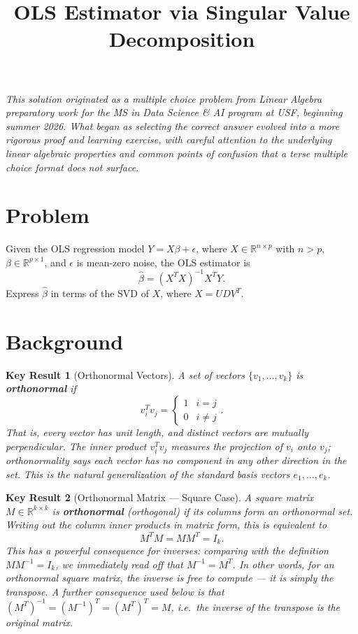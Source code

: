 \documentclass{article}
\title{OLS Estimator via Singular Value Decomposition}
\date{}
\newtheorem*{result}{Key Result}
\begin{document}
\maketitle

\noindent\textit{This solution originated as a multiple choice problem from Linear Algebra
preparatory work for the MS in Data Science \& AI program at USF, beginning summer 2026. What began as selecting the correct answer evolved
into a more rigorous proof and learning exercise, with careful attention to the
underlying linear algebraic properties and common points of confusion that
a terse multiple choice format does not surface.}


\section*{Problem}

Given the OLS regression model $Y = X\beta + \epsilon$, where $X \in \mathbb{R}^{n \times p}$
with $n > p$, $\beta \in \mathbb{R}^{p \times 1}$, and $\epsilon$ is mean-zero noise,
the OLS estimator is
\[
    \hat{\beta} = (X^T X)^{-1} X^T Y.
\]
Express $\hat{\beta}$ in terms of the SVD of $X$, where $X = UDV^T$.

\section*{Background}

\begin{result}[Orthonormal Vectors]
A set of vectors $\{v_1, \ldots, v_k\}$ is \textbf{orthonormal} if
\[
    v_i^T v_j = \begin{cases} 1 & i = j \\ 0 & i \neq j \end{cases}.
\]
That is, every vector has unit length, and distinct vectors are mutually perpendicular.
The inner product $v_i^T v_j$ measures the projection of $v_i$ onto $v_j$; orthonormality
says each vector has no component in any other direction in the set. This is the
natural generalization of the standard basis vectors $e_1, \ldots, e_k$.
\end{result}

\begin{result}[Orthonormal Matrix --- Square Case]
A square matrix $M \in \mathbb{R}^{k \times k}$ is \textbf{orthonormal} (orthogonal) if
its columns form an orthonormal set. Writing out the column inner products in matrix form,
this is equivalent to
\[
    M^TM = MM^T = I_k.
\]
This has a powerful consequence for inverses: comparing with the definition $MM^{-1} = I_k$,
we immediately read off that $M^{-1} = M^T$. In other words, for an orthonormal square
matrix, the inverse is free to compute --- it is simply the transpose. A further
consequence used below is that $(M^T)^{-1} = (M^{-1})^T = (M^T)^T = M$, i.e.\ the
inverse of the transpose is the original matrix.
\end{result}
\end{document}
